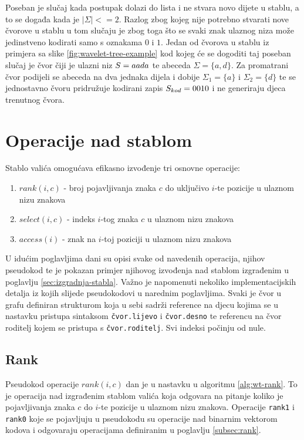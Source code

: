 \documentclass[times, utf8, seminar, numeric]{fer}
\begin{document}
Poseban je slučaj kada postupak dolazi do lista i ne stvara novo dijete u stablu, a to se događa kada je $|\Sigma| <= 2$. Razlog zbog kojeg nije potrebno stvarati nove čvorove u stablu u tom slučaju je zbog toga što se svaki znak ulaznog niza može jedinstveno kodirati samo s oznakama $0$ i $1$. Jedan od čvorova u stablu iz primjera sa slike \ref{fig:wavelet-tree-example} kod kojeg će se dogoditi taj poseban slučaj je čvor čiji je ulazni niz $\mathnormal{S} = aada$ te abeceda $ \Sigma = \{a,d\} $. Za promatrani čvor podijeli se abeceda na dva jednaka dijela i dobije $ \Sigma_1 = \{a\} $ i $ \Sigma_2 = \{d\} $ te se jednostavno čvoru pridružuje kodirani zapis $ \mathnormal{S}_{kod} = 0010 $ i ne generiraju djeca trenutnog čvora.

\section{Operacije nad stablom}
\label{sec:operacije-nad-stablom}

Stablo valića omogućava efikasno izvođenje tri osnovne operacije:

\begin{enumerate}
	\item $rank(i, c)$ - broj pojavljivanja znaka $c$ do uključivo $i$-te pozicije u ulaznom nizu znakova
	\item $select(i, c)$ - indeks $i$-tog znaka $c$ u ulaznom nizu znakova
	\item $access(i)$ - znak na $i$-toj poziciji u ulaznom nizu znakova
\end{enumerate}


U idućim poglavljima dani su opisi svake od navedenih operacija, njihov pseudokod te je pokazan primjer njihovog izvođenja nad stablom izgrađenim u poglavlju \ref{sec:izgradnja-stabla}. Važno je napomenuti nekoliko implementacijskih detalja iz kojih slijede pseudokodovi u narednim poglavljima. Svaki je čvor u grafu definiran strukturom koja u sebi sadrži reference na djecu kojima se u nastavku pristupa sintaksom \texttt{čvor.lijevo} i \texttt{čvor.desno} te referencu na čvor roditelj kojem se pristupa s \texttt{čvor.roditelj}. Svi indeksi počinju od nule.

\subsection{Rank}
Pseudokod operacije $rank(i, c)$ dan je u nastavku u algoritmu \ref{alg:wt-rank}. To je operacija nad izgrađenim stablom valića koja odgovara na pitanje koliko je pojavljivanja znaka $c$ do $i$-te pozicije u ulaznom nizu znakova. Operacije \texttt{rank1} i \texttt{rank0} koje se pojavljuju u pseudokodu su operacije nad binarnim vektorom kodova i odgovaraju operacijama definiranim u poglavlju \ref{subsec:rank}.
\end{document}
